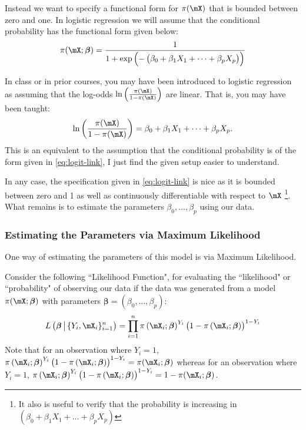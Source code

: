 \documentclass[10pt]{article}
\begin{document}
Instead we want to specify a functional form for  \(\pi(\mX)\) that is bounded between zero and one. In logistic regression we will assume that the conditional probability has the functional form given below:
\begin{equation}
	\label{eq:logit-link}
	\pi(\mX;\boldsymbol{\beta}) = \frac{1}{1 + \exp\left(-\left(\beta_0 + \beta_1 X_1 + \dots + \beta_p X_p\right)\right)} 
\end{equation}

In class or in prior courses, you may have been introduced to logistic regression as assuming that the log-odds \(\ln\left(\frac{\pi(\mX)}{1 - \pi(\mX)} \right)\) are linear. That is, you may have been taught:
\[
	\ln\left(\frac{\pi(\mX)}{1 - \pi(\mX)} \right) = \beta_0 + \beta_1 X_1 + \dots+\beta_p X_p
.\] 
This is an equivalent to the assumption that the conditional probability is of the form given in \eqref{eq:logit-link}, I just find the given setup easier to understand.

In any case, the specification given in \eqref{eq:logit-link} is nice as it is bounded between zero and 1 as well as continuously differentiable with respect to \(\mX\) \footnote{It also is useful to verify that the probability is increasing in  \(\left(\beta_0 + \beta_1 X_1 + \dots + \beta_p X_p\right)\)}. What remains is to estimate the parameters \(\beta_0, \dots, \beta_p\) using our data.

\subsubsection{Estimating the Parameters via Maximum Likelihood}%
\label{subsubsec:MLE}

One way of estimating the parameters of this model is via Maximum Likelihood. 

Consider the following ``Likelihood Function", for evaluating the ``likelihood" or ``probability" of observing our data if the data was generated from a model  \(\pi(\mX ;\boldsymbol{\beta})\) with parameters \(\boldsymbol{\beta} = \left(\beta_0, \dots, \beta_p\right)\):
\begin{equation}
	\label{eq:likelihood}
	L\left(\boldsymbol{\beta}\, \middle|\, \{Y_i, \mX_i\}_{i=1}^n \right) = \prod_{i=1}^n \pi\left(\mX_i;\boldsymbol{\beta}\right)^{Y_i}\left(1 - \pi\left(\mX_i ; \boldsymbol{\beta}\right)\right)^{1-Y_i}
\end{equation}
Note that for an observation where \(Y_i = 1\), \(\pi\left(\mX_i;\boldsymbol{\beta}\right)^{Y_i}\left(1 - \pi\left(\mX_i ; \boldsymbol{\beta}\right)\right)^{1-Y_i} = \pi(\mX_i;\boldsymbol{\beta})\) whereas for an observation where \(Y_i = 1\),  \(\pi\left(\mX_i;\boldsymbol{\beta}\right)^{Y_i}\left(1 - \pi\left(\mX_i ; \boldsymbol{\beta}\right)\right)^{1-Y_i} = 1 - \pi(\mX_i;\boldsymbol{\beta})\).
\end{document}
